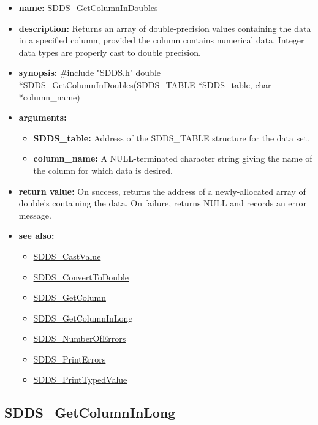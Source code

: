 \documentclass[11pt]{article}
\newcommand{\progref}[1]{\hyperref{SDDS_#1}{{\tt SDDS\_#1} (}{)}{SDDS_#1}}
\begin{document}
\begin{itemize}
\item {\bf name:}\newline
SDDS\_GetColumnInDoubles
\item {\bf description:}\newline
Returns an array of double-precision values containing the data in a specified column, provided the column contains numerical data. Integer data types are properly cast to double precision.
\item {\bf synopsis:} \#include "SDDS.h"\newline
double *SDDS\_GetColumnInDoubles(SDDS\_TABLE *SDDS\_table, char *column\_name)
\item {\bf arguments:}
\begin{itemize}
\item {\bf SDDS\_table:} Address of the SDDS\_TABLE structure for the data set.
\item {\bf column\_name:} A NULL-terminated character string giving the name of the column for which data is desired.
\end{itemize}
\item {\bf return value:}\newline
On success, returns the address of a newly-allocated array of  double's containing the data. On failure, returns NULL and records an error message.
\item {\bf see also:}
\begin{itemize}
\item \progref{CastValue}
\item \progref{ConvertToDouble}
\item \progref{GetColumn}
\item \progref{GetColumnInLong}
\item \progref{NumberOfErrors}
\item \progref{PrintErrors}
\item \progref{PrintTypedValue}
\end{itemize}
\end{itemize}

\subsection{SDDS\_GetColumnInLong}
\label{SDDS_GetColumnInLong}
\end{document}
